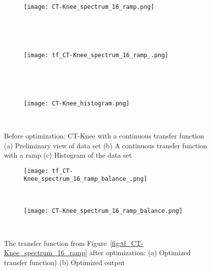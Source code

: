 \begin{figure}
\centering

\begin{subfigure}{0.33\textwidth}
\texttt{[image: CT-Knee\_spectrum\_16\_ramp.png]}
\caption{~}
\end{subfigure}~
\begin{subfigure}{0.33\textwidth}
\texttt{[image: tf\_CT-Knee\_spectrum\_16\_ramp\_.png]}
\caption{~}
\label{fig:tf_CT-Knee_spectrum_16_ramp_}
\end{subfigure}~
\begin{subfigure}{0.33\textwidth}
\texttt{[image: CT-Knee\_histogram.png]}
\caption{~}
\label{fig:CT-Knee_histogram}
\end{subfigure}
\caption[Before optimization: CT-Knee with a continuous transfer function]{Before optimization: CT-Knee with a continuous transfer 
function (a) Preliminary view of data set (b) A continuous transfer 
function with a ramp (c) Histogram of the data set}
\label{fig:tf_CT-Knee_spectrum_16_ramp}

\begin{subfigure}{0.33\textwidth}
\texttt{[image: tf\_CT-Knee\_spectrum\_16\_ramp\_balance\_.png]}
\caption{~}
\end{subfigure}
\begin{subfigure}{0.33\textwidth}
\texttt{[image: CT-Knee\_spectrum\_16\_ramp\_balance.png]}    
\caption{~}
\end{subfigure}
\caption[After optimization: CT-Knee with the continuous transfer function]{The transfer function from Figure~\ref{fig:tf_CT-Knee_spectrum_16_ramp} after optimization: (a) Optimized transfer function) (b) Optimized output}
\label{fig:tf_CT-Knee_spectrum_16_ramp_balance}

\end{figure}

